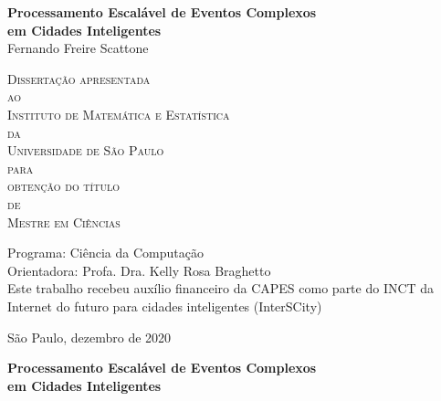 \documentclass[11pt,twoside,a4paper]{book}
\begin{document}
\frontmatter 
\fancyhead[RO]{{\footnotesize\rightmark}\hspace{2em}\thepage}
\setcounter{tocdepth}{2}
\fancyhead[LE]{\thepage\hspace{2em}\footnotesize{\leftmark}}
\fancyhead[RE,LO]{}
\fancyhead[RO]{{\footnotesize\rightmark}\hspace{2em}\thepage}

\onehalfspacing  %

\thispagestyle{empty}
\begin{center}
    \vspace*{2.3cm}
    \textbf{\Large{Processamento Escalável de Eventos Complexos \\
    em Cidades Inteligentes}}\\
    
    \vspace*{1.2cm}
    \Large{Fernando Freire Scattone}
    
    \vskip 2cm
    \textsc{
    Dissertação apresentada\\[-0.25cm] 
    ao\\[-0.25cm]
    Instituto de Matemática e Estatística\\[-0.25cm]
    da\\[-0.25cm]
    Universidade de São Paulo\\[-0.25cm]
    para\\[-0.25cm]
    obtenção do título\\[-0.25cm]
    de\\[-0.25cm]
    Mestre em Ciências}
    
    \vskip 1.5cm
    Programa: Ciência da Computação\\
    Orientadora: Profa. Dra. Kelly Rosa Braghetto\\

   	\vskip 1cm
    \normalsize{Este trabalho recebeu auxílio
    financeiro da CAPES como parte do INCT da Internet do futuro para cidades inteligentes (InterSCity) }
    
    \vskip 0.5cm
    \normalsize{São Paulo, dezembro de 2020}
\end{center}

%
%
%
\newpage
\thispagestyle{empty}
    \begin{center}
        \vspace*{2.3 cm}
        \textbf{\Large{Processamento Escalável de Eventos Complexos \\
    em Cidades Inteligentes}}\\
        \vspace*{2 cm}
    \end{center}
\end{document}
